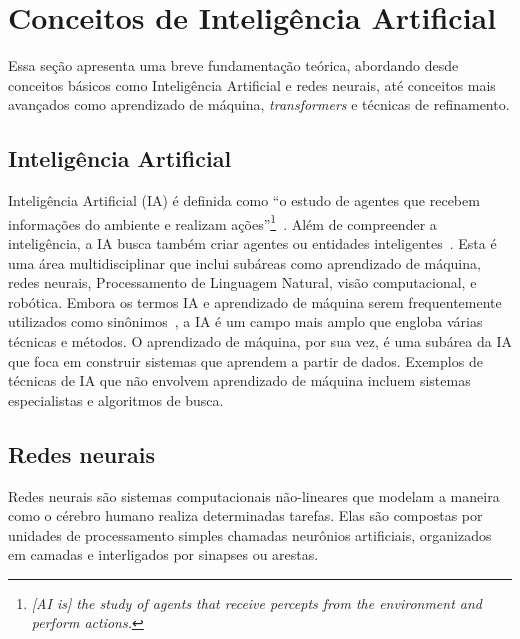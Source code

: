 \documentclass[journal]{IEEEtran}
\begin{document}
\section{Conceitos de Inteligência Artificial\label{sec:conceitos_ia}}

\noindent%
Essa seção apresenta uma breve fundamentação teórica, abordando desde conceitos básicos como Inteligência Artificial e redes neurais, até conceitos mais avançados como aprendizado de máquina, \textit{transformers} e técnicas de refinamento.

\subsection{Inteligência Artificial}

\noindent%
Inteligência Artificial (IA) é definida como ``o estudo de agentes que recebem informações do ambiente e realizam ações''\footnote{%
\textit{[AI is] the study of agents that receive percepts from the environment and perform actions.}}~\cite{russell2016artificial}.
Além de compreender a inteligência, a IA busca também criar agentes ou entidades inteligentes~\cite{russell2016artificial}.
Esta é uma área multidisciplinar que inclui subáreas como aprendizado de máquina, redes neurais, Processamento de Linguagem Natural, visão computacional, e robótica.
Embora os termos IA e aprendizado de máquina serem frequentemente utilizados como sinônimos~\cite{googleaivsml}, a IA é um campo mais amplo que engloba várias técnicas e métodos.
O aprendizado de máquina, por sua vez, é uma subárea da IA que foca em construir sistemas que aprendem a partir de dados.
Exemplos de técnicas de IA que não envolvem aprendizado de máquina incluem sistemas especialistas e algoritmos de busca.

\subsection{Redes neurais}

\noindent%
Redes neurais são sistemas computacionais não-lineares que modelam a maneira como o cérebro humano realiza determinadas tarefas.
Elas são compostas por unidades de processamento simples chamadas neurônios artificiais, organizados em camadas e interligados por sinapses ou arestas.
\end{document}
